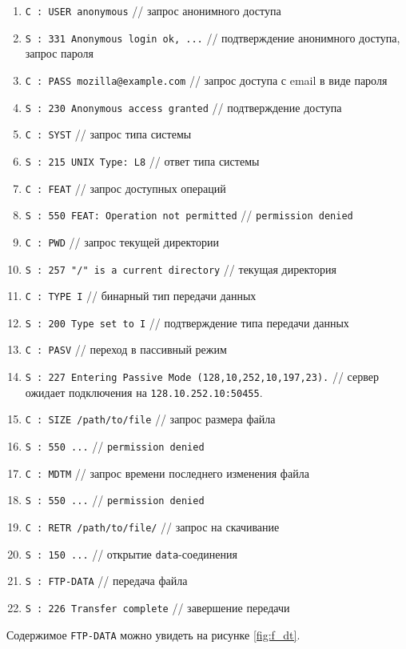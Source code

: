 \documentclass[12pt, a4paper]{article}
\begin{document}
\begin{enumerate}
  \item \texttt{C : USER anonymous} // запрос анонимного доступа
  \item \texttt{S : 331 Anonymous login ok, ...} // подтверждение анонимного
    доступа, запрос пароля
  \item \texttt{C : PASS mozilla@example.com} // запрос доступа с email в виде
    пароля
  \item \texttt{S : 230 Anonymous access granted} // подтверждение доступа
  \item \texttt{C : SYST} // запрос типа системы
  \item \texttt{S : 215 UNIX Type: L8} // ответ типа системы
  \item \texttt{C : FEAT} // запрос доступных операций
  \item \texttt{S : 550 FEAT: Operation not permitted} // \texttt{permission denied}
  \item \texttt{C : PWD} // запрос текущей директории
  \item \texttt{S : 257 "/" is a current directory} // текущая директория
  \item \texttt{C : TYPE I} // бинарный тип передачи данных
  \item \texttt{S : 200 Type set to I} // подтверждение типа передачи данных
  \item \texttt{C : PASV} // переход в пассивный режим
  \item \texttt{S : 227 Entering Passive Mode (128,10,252,10,197,23).} // 
    сервер ожидает подключения на \texttt{128.10.252.10:50455}.
  \item \texttt{C : SIZE /path/to/file} // запрос размера файла
  \item \texttt{S : 550 ...} // \texttt{permission denied}
  \item \texttt{C : MDTM} // запрос времени последнего изменения файла
  \item \texttt{S : 550 ...} // \texttt{permission denied}
  \item \texttt{C : RETR /path/to/file/} // запрос на скачивание
  \item \texttt{S : 150 ...} // открытие \texttt{data}-соединения
  \item \texttt{S : FTP-DATA} // передача файла
  \item \texttt{S : 226 Transfer complete} // завершение передачи
\end{enumerate}

Содержимое \texttt{FTP-DATA} можно увидеть на рисунке \ref{fig:f_dt}.
\end{document}
